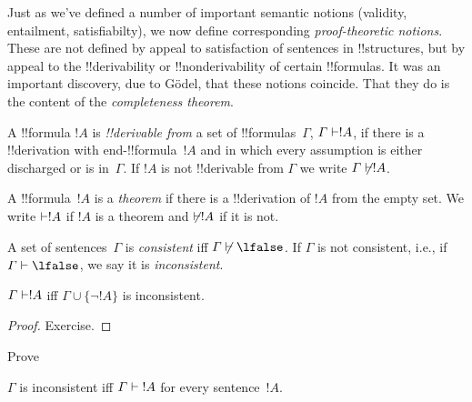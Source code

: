\documentclass[../../../include/open-logic-section]{subfiles}
\begin{document}

\begin{explain}
Just as we've defined a number of important semantic notions
(validity, entailment, satisfiabilty), we now define corresponding
\emph{proof-theoretic notions}.  These are not defined by appeal to
satisfaction of sentences in !!{structure}s, but by appeal to the
!!{derivability} or !!{nonderivability} of certain !!{formula}s.  It was
an important discovery, due to G\"odel, that these notions coincide.
That they do is the content of the \emph{completeness theorem}.
\end{explain}

\begin{defn}[!!^{derivability}]
A !!{formula} $!A$ is \emph{!!{derivable} from} a set of
!!{formula}s~$\Gamma$, $\Gamma \Proves !A$, if there is a
!!{derivation} with end-!!{formula}~$!A$ and in which every assumption
is either discharged or is in~$\Gamma$. If $!A$ is not
!!{derivable} from $\Gamma$ we write $\Gamma \Proves/ !A$.
\end{defn}

\begin{defn}[Theorems]
A !!{formula}~$!A$ is a \emph{theorem} if there is a !!{derivation} of
$!A$ from the empty set.  We write $\Proves !A$ if $!A$ is a theorem
and $\Proves/ !A$ if it is not.
\end{defn}

\begin{defn}[Consistency]
A set of sentences~$\Gamma$ is \emph{consistent} iff $\Gamma
\Proves/ \lfalse$.  If $\Gamma$ is not consistent, i.e., if
$\Gamma \Proves \lfalse$, we say it is \emph{inconsistent}.
\end{defn}

\begin{prop}
$\Gamma \Proves !A$ iff $\Gamma \cup \{\lnot !A\}$ is inconsistent.
\end{prop}

\begin{proof}
Exercise.
\end{proof}

\begin{prob}
Prove 
\end{prob}

\begin{prop}
$\Gamma$ is inconsistent iff $\Gamma \Proves {!A}$ for every
  sentence~$!A$.
\end{prop}
\end{document}
